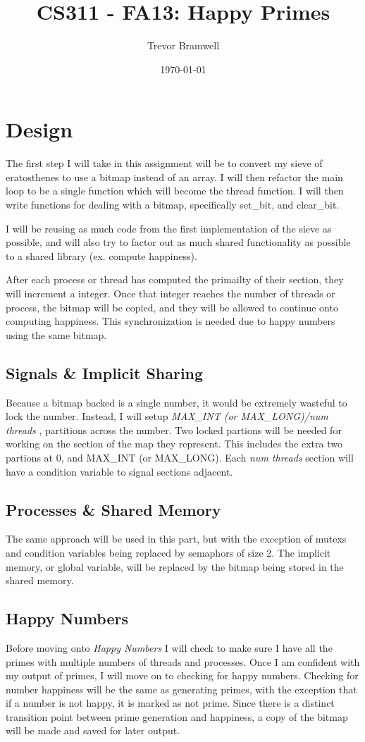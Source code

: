 \documentclass[letterpaper,10pt]{article}
\title{CS311 - FA13: Happy Primes}
\date{\today}
\author{Trevor Bramwell}
\begin{document}
\maketitle

\section{Design}
The first step I will take in this assignment will be to convert my
sieve of eratosthenes to use a bitmap instead of an array. I will then
refactor the main loop to be a single function which will become the
thread function. I will then write functions for dealing with a bitmap,
specifically set\_bit, and clear\_bit.

I will be reusing as much code from the first implementation of the
sieve as possible, and will also try to factor out as much shared
functionality as possible to a shared library (ex. compute happiness).

After each process or thread has computed the primailty of their
section, they will increment a integer. Once that integer reaches the
number of threads or process, the bitmap will be copied, and they will
be allowed to continue onto computing happiness. This synchronization is
needed due to happy numbers using the same bitmap.

\subsection{Signals \& Implicit Sharing}
Because a bitmap backed is a single number, it would be extremely wasteful to
lock the number. Instead, I will setup \emph{MAX\_INT (or MAX\_LONG)/num
threads} , partitions across the number. Two locked partions will be
needed for working on the section of the map they represent. This
includes the extra two partions at 0, and MAX\_INT (or MAX\_LONG). Each
\emph{num threads} section will have a condition variable to signal
sections adjacent.

\subsection{Processes \& Shared Memory}
The same approach will be used in this part, but with the exception of
mutexs and condition variables being replaced by semaphors of size 2.
The implicit memory, or global variable, will be replaced by the bitmap
being stored in the shared memory.

\subsection{Happy Numbers}
Before moving onto \emph{Happy Numbers} I will check to make sure I have
all the primes with multiple numbers of threads and processes. Once I am
confident with my output of primes, I will move on to checking for happy
numbers. Checking for number happiness will be the same as generating
primes, with the exception that if a number is not happy, it is marked
as not prime. Since there is a distinct transition point between prime
generation and happiness, a copy of the bitmap will be made and saved
for later output.
\end{document}
